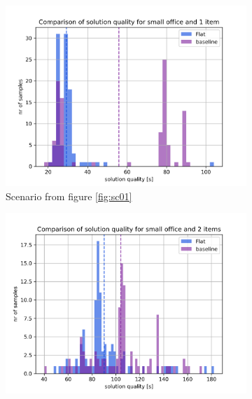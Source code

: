 \begin{figure}
    \centering
    \begin{subfigure}[b]{0.49\textwidth}
        \includegraphics[width=\textwidth]{Report/images/sol_quality/envsmall_sc01_solqual_hist.png}
        \caption{Scenario from figure \ref{fig:sc01}}
        \label{subfig:b1vsFlat_sc01}
    \end{subfigure}
    \begin{subfigure}[b]{0.49\textwidth}
         \includegraphics[width=\textwidth]{Report/images/sol_quality/envsmall_sc04_solqual_hist.png}

\end{subfigure}
\end{figure}
